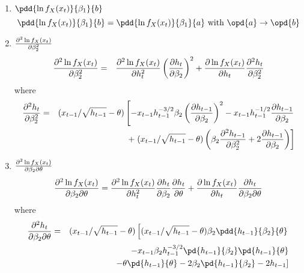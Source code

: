 \documentclass{book}
\begin{document}
\begin{enumerate}
\item $\pdd{\ln f_X(x_t)}{\beta_1}{b}$
  \begin{equation*}
    \pdd{\ln f_X(x_t)}{\beta_1}{b} =
    \pdd{\ln f_X(x_t)}{\beta_1}{a} \text{ with }
    \opd{a} \to \opd{b}
  \end{equation*}

\item $\partial^2 \ln f_X(x_t) \over \partial \beta_2^2$
  \begin{eqnarray*}
    {\partial^2 \ln f_X(x_t) \over \partial \beta_2^2} &=&
    {\partial^2 \ln f_X(x_t) \over \partial h_t^2} \left(
      \partial h_t \over \partial \beta_2
    \right)^2  + {\partial \ln f_X(x_t) \over \partial h_t}
    {\partial^2 h_t \over \partial \beta_2^2}
  \end{eqnarray*}
  where
  \begin{eqnarray*}
    {\partial^2 h_t \over \partial \beta_2^2} &=&
    (x_{t-1}/\sqrt{h_{t-1}} - \theta)\left[
      -x_{t-1} h_{t-1}^{-3/2} \beta_2
      \left({\partial h_{t-1} \over \partial \beta_2}\right)^2
      - x_{t-1} h_{t-1}^{-1/2}
      {\partial h_{t-1} \over \partial \beta_2} \right.\\
    &&
    + \left.(x_{t-1} / \sqrt{h_{t-1}} - \theta) \left(
        \beta_2 {\partial^2 h_{t-1} \over \partial \beta_2^2}
        + 2 {\partial h_{t-1} \over \partial \beta_2}
      \right)
    \right]
  \end{eqnarray*}

\item $\partial^2 \ln f_X(x_t) \over \partial \beta_2 \partial \theta$
  \begin{equation*}
    {\partial^2 \ln f_X(x_t) \over \partial \beta_2 \partial \theta} =
    {\partial^2 \ln f_X(x_t) \over \partial h_t^2}
    {\partial h_t \over \partial \beta_2}
    {\partial h_t \over \partial \theta}
    +
    {\partial \ln f_X(x_t) \over \partial h_t}
    {\partial h_t \over \partial \beta_2 \partial \theta}
  \end{equation*}
  where
  \begin{eqnarray*}
    {\partial^2 h_t \over \partial \beta_2 \partial \theta} &=&
    (x_{t-1}/\sqrt{h_{t-1}} - \theta) \left[
      (x_{t-1}/\sqrt{h_{t-1}} - \theta) \beta_2
      \pdd{h_{t-1}}{\beta_2}{\theta} \right.\\
    && -x_{t-1} \beta_2 h_{t-1}^{-3/2} \pd{h_{t-1}}{\beta_2}
    \pd{h_{t-1}}{\theta} \\
    && \left.-\theta \pd{h_{t-1}}{\theta} -2\beta_2
      \pd{h_{t-1}}{\beta_2} -2h_{t-1} \right]
  \end{eqnarray*}


\end{enumerate}
\end{document}
